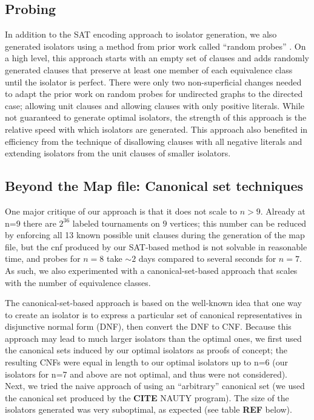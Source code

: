 \documentclass[a4paper,UKenglish,cleveref, autoref, thm-restate]{lipics-v2021}
\begin{document}
\subsection{Probing}
In addition to the SAT encoding approach to isolator generation, we also generated isolators using a method from prior work called ``random probes''  \cite{ref_heule}. On a high level, this approach starts with an empty set of clauses and adds randomly generated clauses that preserve at least one member of each equivalence class until the isolator is perfect.  There were only two non-superficial changes needed to adapt the prior work on random probes for undirected graphs to the directed case; allowing unit clauses and allowing clauses with only positive literals. While not guaranteed to generate optimal isolators, the strength of this approach is the relative speed with which isolators are generated. This approach also benefited in efficiency from the technique of disallowing clauses with all negative literals and extending isolators from the unit clauses of smaller isolators.

\subsection{Beyond the Map file: Canonical set techniques}
One major critique of our approach is that it does not scale to $n>9$. Already at n=9 there are $2^{36}$ labeled tournaments on $9$ vertices; this number can be reduced by enforcing all 13 known possible unit clauses during the generation of the map file, but the cnf produced by our SAT-based method is not solvable in reasonable time, and probes for $n=8$ take $\sim 2$ days compared to several seconds for $n=7$. As such, we also experimented with a canonical-set-based approach that scales with the number of equivalence classes. 

The canonical-set-based approach is based on the well-known idea that one way to create an isolator is to express a particular set of canonical representatives in disjunctive normal form (DNF), then convert the DNF to CNF. Because this approach may lead to much larger isolators than the optimal ones, we first used the canonical sets induced by our optimal isolators as proofs of concept; the resulting CNFs were equal in length to our optimal isolators up to n=6 (our isolators for n=7 and above are not optimal, and thus were not considered). Next, we tried the naive approach of using an ``arbitrary'' canonical set (we used the canonical set produced by the \textbf{CITE}  NAUTY program). The size of the isolators generated was very suboptimal, as expected (see table \textbf{REF} below).
\end{document}
